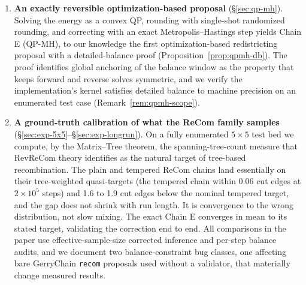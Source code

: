 \documentclass[11pt]{article}
\begin{document}
\begin{enumerate}
  \item \textbf{An exactly reversible optimization-based proposal}
    (\S\ref{sec:qp-mh}). Solving the energy as a convex QP,
    rounding with single-shot randomized rounding, and correcting
    with an exact Metropolis--Hastings step yields Chain E (QP-MH),
    to our knowledge the first optimization-based redistricting
    proposal with a detailed-balance proof
    (Proposition~\ref{prop:qpmh-db}). The proof identifies global
    anchoring of the balance window as the property that keeps
    forward and reverse solves symmetric, and we verify the
    implementation's kernel satisfies detailed balance to machine
    precision on an enumerated test case
    (Remark~\ref{rem:qpmh-scope}).

  \item \textbf{A ground-truth calibration of what the ReCom family
    samples} (\S\ref{sec:exp-5x5}--\S\ref{sec:exp-longrun}). On a
    fully enumerated $5 \times 5$ test bed we compute, by the
    Matrix--Tree theorem, the spanning-tree-count measure that
    RevReCom theory identifies as the natural target of tree-based
    recombination. The plain and tempered ReCom chains land
    essentially on their tree-weighted quasi-targets (the tempered
    chain within 0.06 cut edges at $2 \times 10^5$ steps) and 1.6 to
    1.9 cut edges below the nominal tempered target, and the gap does
    not shrink with run length. It is convergence to the wrong
    distribution, not slow mixing. The exact Chain E converges in
    mean to its stated target, validating the correction end to
    end. All comparisons in the paper use effective-sample-size
    corrected inference and per-step balance audits, and we document
    two balance-constraint bug classes, one affecting bare
    GerryChain \texttt{recom} proposals used without a validator,
    that materially change measured results.


\end{enumerate}
\end{document}
